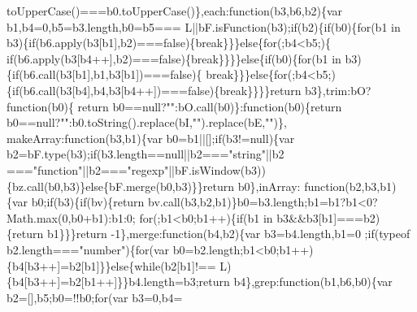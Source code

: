 \begin{DoxyCode}
      toUpperCase()===b0.toUpperCase()\},each:\textcolor{keyword}{function}(b3,b6,b2)\{var b1,b4=0,b5=b3.length,b0=b5===
      L||bF.isFunction(b3);\textcolor{keywordflow}{if}(b2)\{\textcolor{keywordflow}{if}(b0)\{\textcolor{keywordflow}{for}(b1 in b3)\{\textcolor{keywordflow}{if}(b6.apply(b3[b1],b2)===\textcolor{keyword}{false})\{\textcolor{keywordflow}{break}\}\}\}\textcolor{keywordflow}{else}\{\textcolor{keywordflow}{for}(;b4<b5;)\{\textcolor{keywordflow}{
      if}(b6.apply(b3[b4++],b2)===\textcolor{keyword}{false})\{\textcolor{keywordflow}{break}\}\}\}\}\textcolor{keywordflow}{else}\{\textcolor{keywordflow}{if}(b0)\{\textcolor{keywordflow}{for}(b1 in b3)\{\textcolor{keywordflow}{if}(b6.call(b3[b1],b1,b3[b1])===\textcolor{keyword}{false})\{\textcolor{keywordflow}{
      break}\}\}\}\textcolor{keywordflow}{else}\{\textcolor{keywordflow}{for}(;b4<b5;)\{\textcolor{keywordflow}{if}(b6.call(b3[b4],b4,b3[b4++])===\textcolor{keyword}{false})\{\textcolor{keywordflow}{break}\}\}\}\}\textcolor{keywordflow}{return} b3\},trim:bO?\textcolor{keyword}{function}(b0)\{\textcolor{keywordflow}{
      return} b0==null?\textcolor{stringliteral}{""}:bO.call(b0)\}:\textcolor{keyword}{function}(b0)\{\textcolor{keywordflow}{return} b0==null?\textcolor{stringliteral}{""}:b0.toString().replace(bI,\textcolor{stringliteral}{""}).replace(bE,\textcolor{stringliteral}{""})\},
      makeArray:\textcolor{keyword}{function}(b3,b1)\{var b0=b1||[];\textcolor{keywordflow}{if}(b3!=null)\{var b2=bF.type(b3);\textcolor{keywordflow}{if}(b3.length==null||b2===\textcolor{stringliteral}{"string"}||b2
      ===\textcolor{stringliteral}{"function"}||b2===\textcolor{stringliteral}{"regexp"}||bF.isWindow(b3))\{bz.call(b0,b3)\}\textcolor{keywordflow}{else}\{bF.merge(b0,b3)\}\}\textcolor{keywordflow}{return} b0\},inArray:\textcolor{keyword}{
      function}(b2,b3,b1)\{var b0;\textcolor{keywordflow}{if}(b3)\{\textcolor{keywordflow}{if}(bv)\{\textcolor{keywordflow}{return} bv.call(b3,b2,b1)\}b0=b3.length;b1=b1?b1<0?Math.max(0,b0+b1):b1:0;\textcolor{keywordflow}{
      for}(;b1<b0;b1++)\{\textcolor{keywordflow}{if}(b1 in b3&&b3[b1]===b2)\{\textcolor{keywordflow}{return} b1\}\}\}\textcolor{keywordflow}{return} -1\},merge:\textcolor{keyword}{function}(b4,b2)\{var b3=b4.length,b1=0
      ;\textcolor{keywordflow}{if}(typeof b2.length===\textcolor{stringliteral}{"number"})\{\textcolor{keywordflow}{for}(var b0=b2.length;b1<b0;b1++)\{b4[b3++]=b2[b1]\}\}\textcolor{keywordflow}{else}\{\textcolor{keywordflow}{while}(b2[b1]!==
      L)\{b4[b3++]=b2[b1++]\}\}b4.length=b3;\textcolor{keywordflow}{return} b4\},grep:\textcolor{keyword}{function}(b1,b6,b0)\{var b2=[],b5;b0=!!b0;\textcolor{keywordflow}{for}(var b3=0,b4=

\end{DoxyCode}
